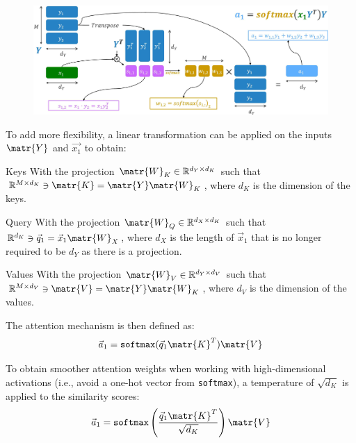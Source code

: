 \begin{description}
        \begin{figure}[H]
            \centering
            \includegraphics[width=0.8\linewidth]{./img/_dot_product_attention.jpg}
        \end{figure}

    \item[Scaled dot-product attention] 
        To add more flexibility, a linear transformation can be applied on the inputs $\matr{Y}$ and $\vec{x_1}$ to obtain:
        \begin{descriptionlist}
            \item[Keys] 
                With the projection $\matr{W}_K \in \mathbb{R}^{d_Y \times d_K}$ such that $\mathbb{R}^{M \times d_K} \ni \matr{K} = \matr{Y} \matr{W}_K$, where $d_K$ is the dimension of the keys.

            \item[Query] 
                With the projection $\matr{W}_Q \in \mathbb{R}^{d_X \times d_K}$ such that $\mathbb{R}^{d_K} \ni \vec{q}_1 = \vec{x}_1 \matr{W}_X$, where $d_X$ is the length of $\vec{x}_1$ that is no longer required to be $d_Y$ as there is a projection.

            \item[Values]
                With the projection $\matr{W}_V \in \mathbb{R}^{d_Y \times d_V}$ such that $\mathbb{R}^{M \times d_V} \ni \matr{V} = \matr{Y} \matr{W}_K$, where $d_V$ is the dimension of the values.
        \end{descriptionlist}

        The attention mechanism is then defined as:
        \[ \vec{a}_1 = \texttt{softmax}(\vec{q}_1 \matr{K}^T)\matr{V} \]

        To obtain smoother attention weights when working with high-dimensional activations (i.e., avoid a one-hot vector from \texttt{softmax}), a temperature of $\sqrt{d_K}$ is applied to the similarity scores:
        \[ \vec{a}_1 = \texttt{softmax}\left( \frac{\vec{q}_1 \matr{K}^T}{\sqrt{d_K}} \right)\matr{V} \]


\end{description}
